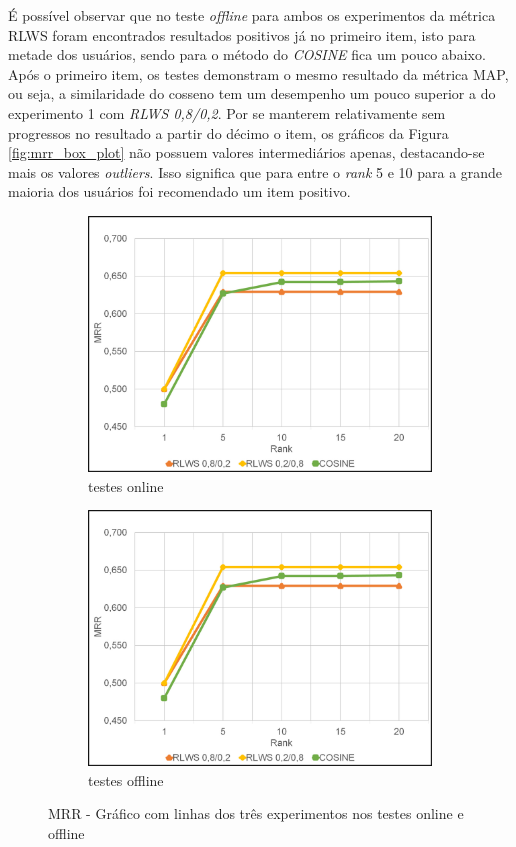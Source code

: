 É possível observar que no teste \textit{offline} para ambos os experimentos da métrica \ac{RLWS} foram encontrados resultados positivos já no primeiro item, isto para metade dos usuários, sendo para o método do \textit{COSINE} fica um pouco abaixo. Após o primeiro item, os testes demonstram o mesmo resultado da métrica \ac{MAP}, ou seja, a similaridade do cosseno tem um desempenho um pouco superior a do experimento 1 com \textit{RLWS 0,8/0,2}. Por se manterem relativamente sem progressos no resultado a partir do décimo o item, os gráficos da Figura \ref{fig:mrr_box_plot} não possuem valores intermediários apenas, destacando-se mais os valores \textit{outliers}. Isso significa que para entre o \textit{rank} 5 e 10 para a grande maioria dos usuários foi recomendado um item positivo.

\begin{figure}
    \begin{subfigure}{.5\textwidth}
        \centering
        \includegraphics[width=.8\linewidth]{imagens/mrr_results.jpg}
        \caption{testes online}
        \label{fig:mrr_line_a}
    \end{subfigure}%
    \begin{subfigure}{.5\textwidth}
        \centering
        \includegraphics[width=.8\linewidth]{imagens/mrr_results.jpg}
        \caption{testes offline}
        \label{fig:mrr_line_b}
    \end{subfigure}
    \caption{MRR - Gráfico com linhas dos três experimentos nos testes online e offline}
    \label{fig:mrr_line}
\end{figure}

